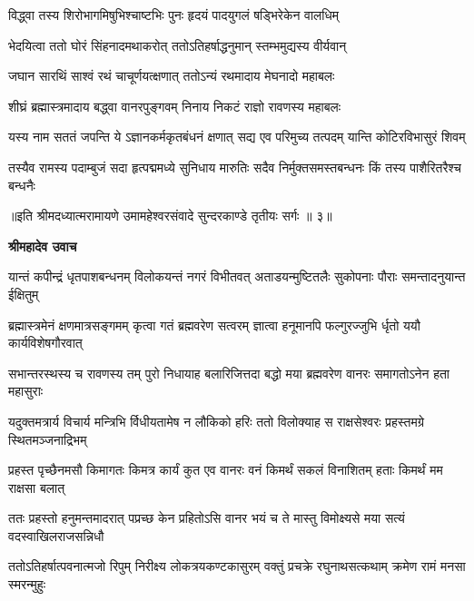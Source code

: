 \twolineshloka
{विद्ध्वा तस्य शिरोभागमिषुभिश्चाष्टभिः पुनः}
{हृदयं पादयुगलं षड्भिरेकेन वालधिम्} %

\twolineshloka
{भेदयित्वा ततो घोरं सिंहनादमथाकरोत्}
{ततोऽतिहर्षाद्धनुमान् स्तम्भमुद्यस्य वीर्यवान्} %

\twolineshloka
{जघान सारथिं साश्वं रथं चाचूर्णयत्क्षणात्}
{ततोऽन्यं रथमादाय मेघनादो महाबलः} %

\twolineshloka
{शीघ्रं ब्रह्मास्त्रमादाय बद्ध्वा वानरपुङ्गवम्}
{निनाय निकटं राज्ञो रावणस्य महाबलः} %

\fourlineindentedshloka
{यस्य नाम सततं जपन्ति ये\-}
{ऽज्ञानकर्मकृतबंधनं क्षणात्}
{सद्य एव परिमुच्य तत्पदम्}
{यान्ति कोटिरविभासुरं शिवम्} %

\fourlineindentedshloka
{तस्यैव रामस्य पदाम्बुजं सदा}
{हृत्पद्ममध्ये सुनिधाय मारुतिः}
{सदैव निर्मुक्तसमस्तबन्धनः}
{किं तस्य पाशैरितरैश्च बन्धनैः} %

{॥इति श्रीमदध्यात्मरामायणे उमामहेश्वरसंवादे सुन्दरकाण्डे
तृतीयः सर्गः ॥ ३॥
}




\textbf{श्रीमहादेव उवाच}

\fourlineindentedshloka
{यान्तं कपीन्द्रं धृतपाशबन्धनम्}
{विलोकयन्तं नगरं विभीतवत्}
{अताडयन्मुष्टितलैः सुकोपनाः}
{पौराः समन्तादनुयान्त ईक्षितुम्} %

\fourlineindentedshloka
{ब्रह्मास्त्रमेनं क्षणमात्रसङ्गमम्}
{कृत्वा गतं ब्रह्मवरेण सत्वरम्}
{ज्ञात्वा हनूमानपि फल्गुरज्जुभि\-}
{र्धृतो ययौ कार्यविशेषगौरवात्} %

\fourlineindentedshloka
{सभान्तरस्थस्य च रावणस्य तम्}
{पुरो निधायाह बलारिजित्तदा}
{बद्धो मया ब्रह्मवरेण वानरः}
{समागतोऽनेन हता महासुराः} %

\fourlineindentedshloka
{यदुक्तमत्रार्य विचार्य मन्त्रिभि\-}
{र्विधीयतामेष न लौकिको हरिः}
{ततो विलोक्याह स राक्षसेश्वरः}
{प्रहस्तमग्रे स्थितमञ्जनाद्रिभम्} %

\fourlineindentedshloka
{प्रहस्त पृच्छैनमसौ किमागतः}
{किमत्र कार्यं कुत एव वानरः}
{वनं किमर्थं सकलं विनाशितम्}
{हताः किमर्थं मम राक्षसा बलात्} %

\fourlineindentedshloka
{ततः प्रहस्तो हनुमन्तमादरात्}
{पप्रच्छ केन प्रहितोऽसि वानर}
{भयं च ते मास्तु विमोक्ष्यसे मया}
{सत्यं वदस्वाखिलराजसन्निधौ} %

\fourlineindentedshloka
{ततोऽतिहर्षात्पवनात्मजो रिपुम्}
{निरीक्ष्य लोकत्रयकण्टकासुरम्}
{वक्तुं प्रचक्रे रघुनाथसत्कथाम्}
{क्रमेण रामं मनसा स्मरन्मुहुः} %

